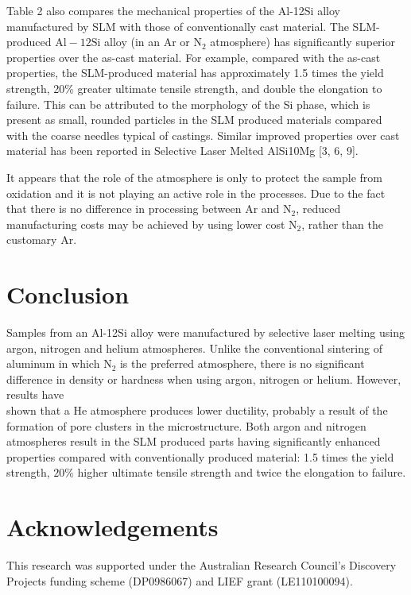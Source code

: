 \documentclass[10pt]{article}
\begin{document}
Table 2 also compares the mechanical properties of the Al-12Si alloy manufactured by SLM with those of conventionally cast material. The SLM-produced $\mathrm{Al}-12 \mathrm{Si}$ alloy (in an $\mathrm{Ar}$ or $\mathrm{N}_{2}$ atmosphere) has significantly superior properties over the as-cast material. For example, compared with the as-cast properties, the SLM-produced material has approximately 1.5 times the yield strength, 20\% greater ultimate tensile strength, and double the elongation to failure. This can be attributed to the morphology of the Si phase, which is present as small, rounded particles in the SLM produced materials compared with the coarse needles typical of castings. Similar improved properties over cast material has been reported in Selective Laser Melted AlSi10Mg [3, 6, 9].

It appears that the role of the atmosphere is only to protect the sample from oxidation and it is not playing an active role in the processes. Due to the fact that there is no difference in processing between $\mathrm{Ar}$ and $\mathrm{N}_{2}$, reduced manufacturing costs may be achieved by using lower cost $\mathrm{N}_{2}$, rather than the customary Ar.

\section*{Conclusion}
Samples from an Al-12Si alloy were manufactured by selective laser melting using argon, nitrogen and helium atmospheres. Unlike the conventional sintering of aluminum in which $\mathrm{N}_{2}$ is the preferred atmosphere, there is no significant difference in density or hardness when using argon, nitrogen or helium. However, results have\\
shown that a He atmosphere produces lower ductility, probably a result of the formation of pore clusters in the microstructure. Both argon and nitrogen atmospheres result in the SLM produced parts having significantly enhanced properties compared with conventionally produced material: 1.5 times the yield strength, $20 \%$ higher ultimate tensile strength and twice the elongation to failure.

\section*{Acknowledgements}
This research was supported under the Australian Research Council’s Discovery Projects funding scheme (DP0986067) and LIEF grant (LE110100094).
\end{document}
